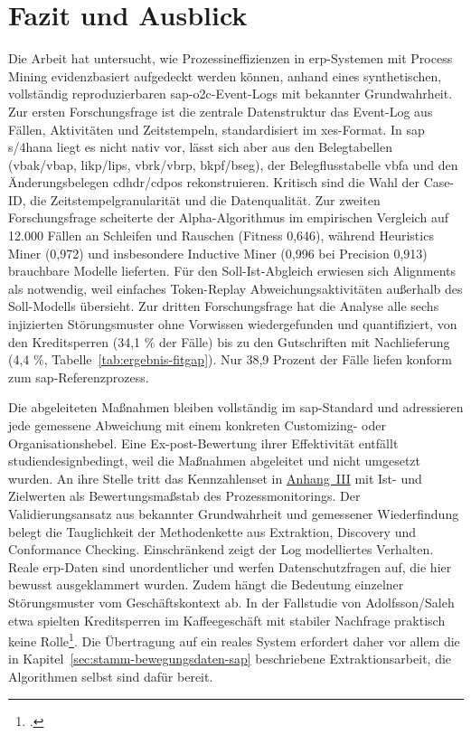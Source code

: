 \chapter{Fazit und Ausblick}\label{ch:fazit}

Die Arbeit hat untersucht, wie Prozessineffizienzen in \gls{erp}-Systemen mit Process Mining evidenzbasiert aufgedeckt werden können, anhand eines synthetischen, vollständig reproduzierbaren \gls{sap}-\gls{o2c}-Event-Logs mit bekannter Grundwahrheit. Zur ersten Forschungsfrage ist die zentrale Datenstruktur das Event-Log aus Fällen, Aktivitäten und Zeitstempeln, standardisiert im \gls{xes}-Format. In \gls{sap} \gls{s/4hana} liegt es nicht nativ vor, lässt sich aber aus den Belegtabellen (\gls{vbak}/\gls{vbap}, \gls{likp}/\gls{lips}, \gls{vbrk}/\gls{vbrp}, \gls{bkpf}/\gls{bseg}), der Belegflusstabelle \gls{vbfa} und den Änderungsbelegen \gls{cdhdr}/\gls{cdpos} rekonstruieren. Kritisch sind die Wahl der Case-ID, die Zeitstempelgranularität und die Datenqualität. Zur zweiten Forschungsfrage scheiterte der Alpha-Algorithmus im empirischen Vergleich auf 12.000 Fällen an Schleifen und Rauschen (Fitness 0,646), während Heuristics Miner (0,972) und insbesondere Inductive Miner (0,996 bei Precision 0,913) brauchbare Modelle lieferten. Für den Soll-Ist-Abgleich erwiesen sich Alignments als notwendig, weil einfaches Token-Replay Abweichungsaktivitäten außerhalb des Soll-Modells übersieht. Zur dritten Forschungsfrage hat die Analyse alle sechs injizierten Störungsmuster ohne Vorwissen wiedergefunden und quantifiziert, von den Kreditsperren (34,1 \% der Fälle) bis zu den Gutschriften mit Nachlieferung (4,4 \%, Tabelle~\ref{tab:ergebnis-fitgap}). Nur 38,9 Prozent der Fälle liefen konform zum \gls{sap}-Referenzprozess.

Die abgeleiteten Maßnahmen bleiben vollständig im \gls{sap}-Standard und adressieren jede gemessene Abweichung mit einem konkreten Customizing- oder Organisationshebel. Eine Ex-post-Bewertung ihrer Effektivität entfällt studiendesignbedingt, weil die Maßnahmen abgeleitet und nicht umgesetzt wurden. An ihre Stelle tritt das Kennzahlenset in \hyperref[anh:kennzahlen]{Anhang~III} mit Ist- und Zielwerten als Bewertungsmaßstab des Prozessmonitorings. Der Validierungsansatz aus bekannter Grundwahrheit und gemessener Wiederfindung belegt die Tauglichkeit der Methodenkette aus Extraktion, Discovery und Conformance Checking. Einschränkend zeigt der Log modelliertes Verhalten. Reale \gls{erp}-Daten sind unordentlicher und werfen Datenschutzfragen auf, die hier bewusst ausgeklammert wurden. Zudem hängt die Bedeutung einzelner Störungsmuster vom Geschäftskontext ab. In der Fallstudie von Adolfsson/Saleh etwa spielten Kreditsperren im Kaffeegeschäft mit stabiler Nachfrage praktisch keine Rolle\footcite[Vgl.][S.~51]{adolfsson2026o2c}. Die Übertragung auf ein reales System erfordert daher vor allem die in Kapitel~\ref{sec:stamm-bewegungsdaten-sap} beschriebene Extraktionsarbeit, die Algorithmen selbst sind dafür bereit.

